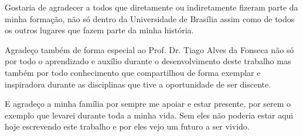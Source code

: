 \begin{agradecimentos}

Gostaria de agradecer a todos que diretamente ou indiretamente fizeram parte da minha formação, não só dentro da Universidade de Brasília assim como de todos os outros lugares que fazem parte da minha história.

Agradeço também de forma especial ao Prof. Dr. Tiago Alves da Fonseca não só por todo o aprendizado e auxílio durante o desenvolvimento deste trabalho mas também por todo conhecimento que compartilhou de forma exemplar e inspiradora durante as disciplinas que tive a oportunidade de ser discente.

E agradeço a minha família por sempre me apoiar e estar presente, por serem o exemplo que levarei durante toda a minha vida. Sem eles não poderia estar aqui hoje escrevendo este trabalho e por eles vejo um futuro a ser vivido.


\end{agradecimentos}
